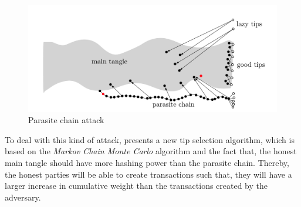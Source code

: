\begin{figure}[H]
    \centering
    \includegraphics[width=\linewidth]{images/tangle-parasite-chain.png}
    \caption{Parasite chain attack}
    \label{fig:tangle-parasite}
\end{figure}


To deal with this kind of attack, \cite{tangle} presents a new tip selection algorithm, which is based on the \emph{Markov Chain Monte Carlo} algorithm and the fact that, the honest main tangle should have more hashing power than the parasite chain. Thereby, the honest parties will be able to create transactions such that, they will have a larger increase in cumulative weight than the transactions created by the adversary.

